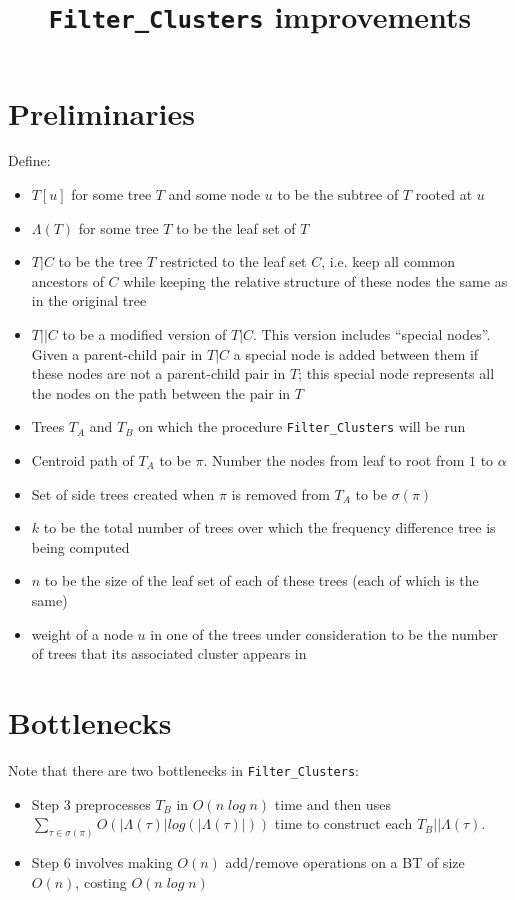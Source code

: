 \documentclass[a4paper]{article}
\title{\texttt{Filter\_Clusters} improvements}
\begin{document}
    \maketitle

    \section{Preliminaries}
    Define:
    \begin{itemize}
        \item $T[u]$ for some tree $T$ and some node $u$ to be the subtree of $T$ rooted at $u$
        \item $\Lambda(T)$ for some tree $T$ to be the leaf set of $T$
        \item $T|C$ to be the tree $T$ restricted to the leaf set $C$, i.e. keep all common ancestors of $C$ while keeping the relative structure of these nodes the same as in the original tree
        \item $T||C$ to be a modified version of $T|C$. This version includes ``special nodes''. Given a parent-child pair in $T|C$ a special node is added between them if these nodes are not a parent-child pair in $T$; this special node represents all the nodes on the path between the pair in $T$
        \item Trees $T_A$ and $T_B$ on which the procedure \texttt{Filter\_Clusters} will be run
        \item Centroid path of $T_A$ to be $\pi$. Number the nodes from leaf to root from $1$ to $\alpha$
        \item Set of side trees created when $\pi$ is removed from $T_A$ to be $\sigma(\pi)$
        \item $k$ to be the total number of trees over which the frequency difference tree is being computed
        \item $n$ to be the size of the leaf set of each of these trees (each of which is the same)
        \item weight of a node $u$ in one of the trees under consideration to be the number of trees that its associated cluster appears in
    \end{itemize}

    \section{Bottlenecks}

    Note that there are two bottlenecks in \texttt{Filter\_Clusters}:
    \begin{itemize}
        \item Step 3 preprocesses $T_B$ in $O(n\;log\;n)$ time and then uses $\sum_{\tau\in\sigma(\pi)}O(|\Lambda(\tau)|log(|\Lambda(\tau)|))$ time to construct each $T_B||\Lambda(\tau)$.

        \item Step 6 involves making $O(n)$ add/remove operations on a BT of size $O(n)$, costing $O(n\;log\;n)$
    \end{itemize}
\end{document}
